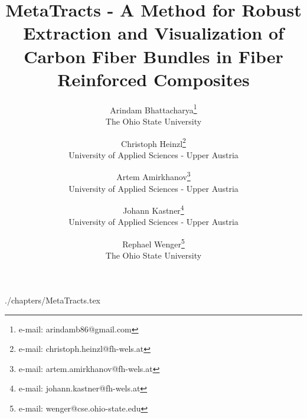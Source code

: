 \documentclass{vgtc}                          %
\title{MetaTracts - A Method for Robust Extraction and Visualization of Carbon Fiber Bundles in Fiber Reinforced Composites}
\author{Arindam Bhattacharya\thanks{e-mail: arindamb86@gmail.com}\\ %
     \scriptsize The Ohio State University\\ %
\and Christoph Heinzl\thanks{e-mail: christoph.heinzl@fh-wels.at}\\ %
     \scriptsize University of Applied Sciences - Upper Austria%
\and Artem Amirkhanov\thanks{e-mail: artem.amirkhanov@fh-wels.at}\\ %
     \scriptsize University of Applied Sciences - Upper Austria%
\and Johann Kastner\thanks{e-mail: johann.kastner@fh-wels.at}\\ %
     \scriptsize University of Applied Sciences - Upper Austria%
\and Rephael Wenger\thanks{e-mail: wenger@cse.ohio-state.edu}\\ %
    \scriptsize The Ohio State University\\ %
}
\begin{document}


\maketitle

 {./chapters/MetaTracts.tex}





\end{document}
